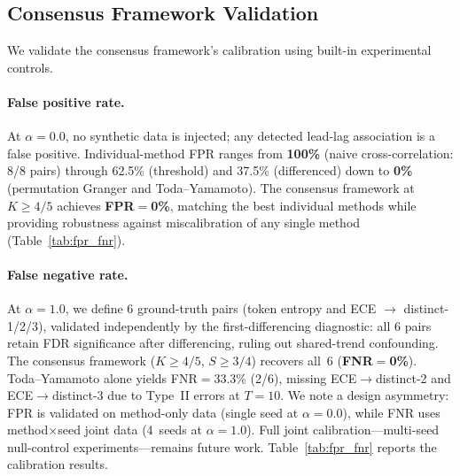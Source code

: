 \subsection{Consensus Framework Validation}
\label{sec:consensus_validation}

We validate the consensus framework's calibration using built-in experimental controls.

\paragraph{False positive rate.}
At $\alpha{=}0.0$, no synthetic data is injected; any detected lead-lag association is a false positive.
Individual-method FPR ranges from \textbf{100\%} (naive cross-correlation: 8/8 pairs) through 62.5\% (threshold) and 37.5\% (differenced) down to \textbf{0\%} (permutation Granger and Toda--Yamamoto).
The consensus framework at $K{\geq}4/5$ achieves \textbf{FPR${=}$0\%}, matching the best individual methods while providing robustness against miscalibration of any single method (Table~\ref{tab:fpr_fnr}).

\paragraph{False negative rate.}
At $\alpha{=}1.0$, we define 6 ground-truth pairs (token entropy and ECE $\to$ distinct-1/2/3), validated independently by the first-differencing diagnostic: all 6 pairs retain FDR significance after differencing, ruling out shared-trend confounding.
The consensus framework ($K{\geq}4/5$, $S{\geq}3/4$) recovers all~6 (\textbf{FNR${=}$0\%}).
Toda--Yamamoto alone yields FNR${=}$33.3\% (2/6), missing ECE$\to$distinct-2 and ECE$\to$distinct-3 due to Type~II errors at $T{=}10$.
We note a design asymmetry: FPR is validated on method-only data (single seed at $\alpha{=}0.0$), while FNR uses method$\times$seed joint data (4~seeds at $\alpha{=}1.0$).
Full joint calibration---multi-seed null-control experiments---remains future work.
Table~\ref{tab:fpr_fnr} reports the calibration results.

